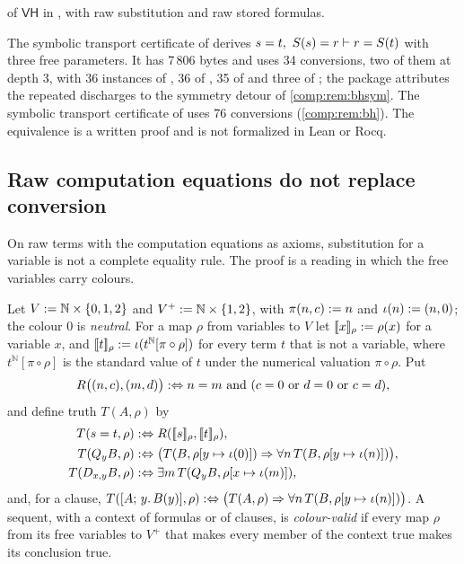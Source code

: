 \begin{remark}
\begin{enumerate}[label=(\alph*)]
 of $\mathsf{VH}$ in , with raw substitution and raw
 stored formulas.
\end{enumerate}
The symbolic transport certificate of  derives
$s=t,\ S(s)=r\vdash r=S(t)$ with three free parameters. It has 7\,806
bytes and uses 34 conversions, two of them at depth $3$, with 36 instances
of , 36 of , 35 of  and three of
; the package attributes the repeated discharges to the
symmetry detour of \cref{comp:rem:bhsym}. The symbolic transport certificate
of  uses 76 conversions (\cref{comp:rem:bh}). The
equivalence is a written proof and is not formalized in Lean or Rocq.
\end{remark}

\subsection{Raw computation equations do not replace conversion}
\label{comp:sec:colour}

On raw terms with the computation equations as axioms, substitution for a
variable is not a complete equality rule. The proof is a reading in which
the free variables carry colours.

\begin{definition}
\label{comp:def:colour}
Let $V\mathrel{:=}\mathbb N\times\{0,1,2\}$ and $V^{+}\mathrel{:=}\mathbb N\times\{1,2\}$,
with $\pi(n,c)\mathrel{:=} n$ and $\iota(n)\mathrel{:=}(n,0)$; the colour $0$ is
\emph{neutral}. For a map $\rho$ from variables to $V$ let
$[\![ x]\!]_\rho\mathrel{:=}\rho(x)$ for a variable $x$, and
$[\![ t]\!]_\rho\mathrel{:=}\iota(t^{\mathbb N}[\pi\circ\rho])$ for every
term $t$ that is not a variable, where $t^{\mathbb N}[\pi\circ\rho]$ is the
standard value of $t$ under the numerical valuation $\pi\circ\rho$. Put
\[
 R\bigl((n,c),(m,d)\bigr)\iffdef n=m\ \text{and}\ (c=0\ \text{or}\ d=0\
 \text{or}\ c=d),
\]
and define truth $T(A,\rho)$ by
\begin{align*}
 T(s=t,\rho)&\mathrel{:\Leftrightarrow} R([\![ s]\!]_\rho,[\![ t]\!]_\rho),\\
 T(Q_{y}B,\rho)&\mathrel{:\Leftrightarrow}\bigl(T(B,\rho[y\mapsto\iota(0)])\Rightarrow
  \forall n\,T(B,\rho[y\mapsto\iota(n)])\bigr),\\
 T(D_{x,y}B,\rho)&\mathrel{:\Leftrightarrow}\exists m\,T(Q_{y}B,\rho[x\mapsto\iota(m)]),
\end{align*}
and, for a clause, $T([A;\,y.\,B(y)],\rho)\mathrel{:\Leftrightarrow}\bigl(T(A,\rho)\Rightarrow
\forall n\,T(B,\rho[y\mapsto\iota(n)])\bigr)$. A sequent, with a context of
formulas or of clauses, is \emph{colour-valid} if every map $\rho$ from its
free variables to $V^{+}$ that makes every member of the context true makes
its conclusion true.
\end{definition}

